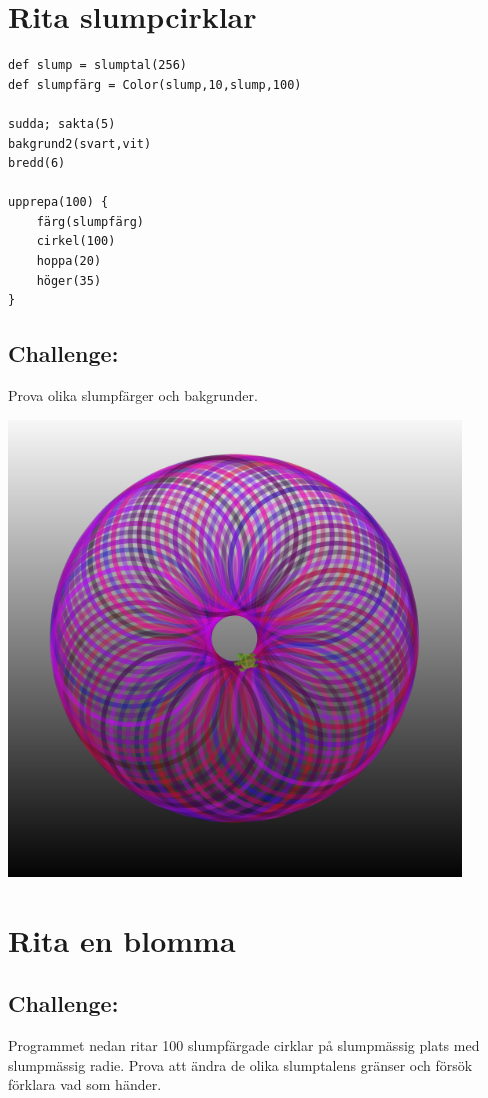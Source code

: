 \chapter{Rita slumpcirklar}
\begin{multicols}{2}

\begin{lstlisting}[basicstyle={\ttfamily\fontsize{16}{19}\selectfont},numbers=none]
def slump = slumptal(256)
def slumpfärg = Color(slump,10,slump,100) 

sudda; sakta(5)
bakgrund2(svart,vit)
bredd(6)

upprepa(100) {
    färg(slumpfärg)
    cirkel(100)
    hoppa(20)
    höger(35)
}
\end{lstlisting}
        
\section*{\color{BrickRed}Challenge:}
Prova olika slumpfärger och bakgrunder.


\columnbreak


\begin{center}
\includegraphics[width=12.0cm]{../img/circle-of-circles.png}
\end{center}

\end{multicols}

\chapter{Rita en blomma}\section*{\color{BrickRed}Challenge:}
Programmet nedan ritar 100 slumpfärgade cirklar på slumpmässig plats med slumpmässig radie. Prova att ändra de olika slumptalens gränser och försök förklara vad som händer.

